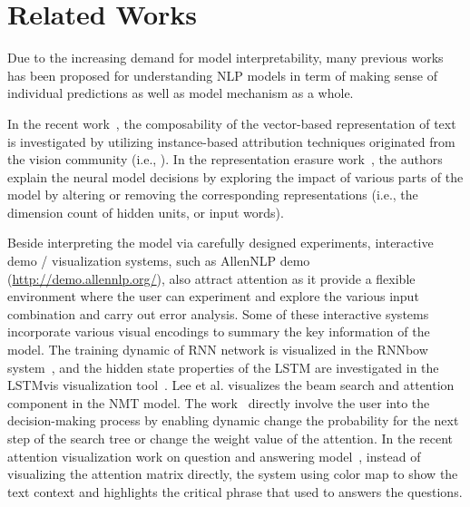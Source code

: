 \section{Related Works}
Due to the increasing demand for model interpretability, many previous works has been proposed for understanding NLP models in term of making sense of individual predictions as well as model mechanism as a whole. 

In the recent work~\cite{LiChenHovy2015}, the composability of the vector-based representation of text is investigated by utilizing instance-based attribution techniques originated from the vision community (i.e., \cite{SimonyanVedaldiZisserman2013, ZeilerFergus2014, YosinskiCluneNguyen2015, OlahMordvintsevSchubert2017}). 
%
In the representation erasure work~\cite{li2016understanding}, the authors explain the neural model decisions by exploring the impact of various parts of the model by altering or removing the corresponding representations (i.e., the dimension count of hidden units, or input words). 

Beside interpreting the model via carefully designed experiments, interactive demo / visualization systems, such as AllenNLP demo (\url{http://demo.allennlp.org/}), also attract attention as it provide a flexible environment where the user can experiment and explore the various input combination and carry out error analysis.
%
Some of these interactive systems incorporate various visual encodings to summary the key information of the model.
%
The training dynamic of RNN network is visualized in the RNNbow system~\cite{CashmanPattersonMosca2017}, and the hidden state properties of the LSTM are investigated in the LSTMvis visualization tool~\cite{StrobeltGehrmannPfister2018}.
Lee et al. visualizes the beam search and attention component in the NMT model. The work~\cite{lee2017interactive} directly involve the user into the decision-making process by enabling dynamic change the probability for the next step of the search tree or change the weight value of the attention.
In the recent attention visualization work on question and answering model~\cite{ruckle2017end}, 
instead of visualizing the attention matrix directly, the system using color map to show the text context and highlights the critical phrase that used to answers the questions. %
%


